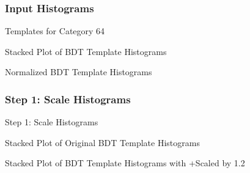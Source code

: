 \subsubsection{Input Histograms}
\begin{frame}{Templates for Category 64}

\begin{minipage}{0.48\textwidth}
\begin{center}
Stacked Plot of BDT Template Histograms

\end{center}
\end{minipage}
\begin{minipage}{0.48\textwidth}
\begin{center}
Normalized BDT Template Histograms

\end{center}

\end{minipage}



\end{frame}

\subsubsection{Step 1: Scale Histograms}
\begin{frame}{Step 1: Scale Histograms}

\begin{minipage}{0.48\textwidth}
\begin{center}
Stacked Plot of Original BDT Template Histograms
\label{fig::compare_stackPlot64}
\end{center}

\end{minipage}
\begin{minipage}{0.48\textwidth}
\begin{center}
Stacked Plot of BDT Template Histograms with \ttbar+\bbbar Scaled by \num[round-precision=1]{1.2}
\label{fig::compare_scaled_stackPlot64}
\end{center}

\end{minipage}




\end{frame}

